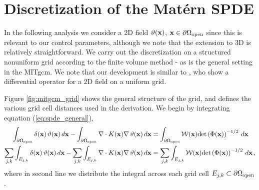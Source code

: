 \section{Discretization of the Mat\'ern SPDE}
\label{sec:discretization_matern}

In the following analysis we consider a 2D field
$\vartheta(\mathbf{x})$, $\mathbf{x}\in\partial\Omega_{\text{open}}$ since this is
relevant to our control parameters, although we note that the
extension to 3D is relatively straightforward.
We carry out the discretization on a structured nonuniform grid according to the
finite volume method - as is the general setting in the MITgcm.
We note that our development is similar to \citet{fuglstad_exploring_2015},
who show a differential operator for a 2D field on a uniform grid.

Figure \ref{fig:mitgcm_grid} shows the general structure of the grid, and
defines the various grid cell distances used in the derivation.
We begin by integrating equation (\ref{eq:spde_general}),
\begin{equation}
    \begin{aligned}
        \int_{\partial\Omega_{\text{open}}} \delta(\mathbf{x})\,\vartheta(\mathbf{x})\, d\mathbf{x} -
        \int_{\partial\Omega_{\text{open}}} \nabla\cdot K(\mathbf{x})\nabla\,\vartheta(\mathbf{x})\,d\mathbf{x}
        &=
        \int_{\partial\Omega_{\text{open}}} \mathcal{W}(\mathbf{x})\text{det}\left(\Phi(\mathbf{x})\right)^{-1/2} \, d\mathbf{x} \\
        \sum_{{j,k}}\int_{E_{j,k}} \delta(\mathbf{x})\,\vartheta(\mathbf{x})\, d\mathbf{x} -
        \sum_{{j,k}}\int_{E_{j,k}} \nabla\cdot K(\mathbf{x})\nabla\,\vartheta(\mathbf{x})\,d\mathbf{x}
        &=
        \sum_{{j,k}}\int_{E_{j,k}} \mathcal{W}(\mathbf{x})\text{det}\left(\Phi(\mathbf{x})\right)^{-1/2} \, d\mathbf{x} \, ,
    \end{aligned}
    \label{eq:spde_integral}
\end{equation}
where in second line we distribute the integral across each grid cell
$E_{j,k}\subset\partial\Omega_{\text{open}}$.


